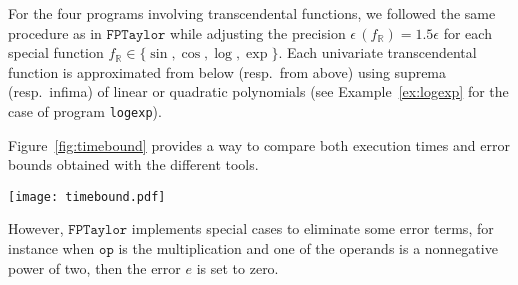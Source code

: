 \documentclass[preprint]{sigplanconf}
\newcommand{\code}[1]{\lstinline{#1}}
\newcommand{\R}{\mathbb{R}}
\newcommand{\realtofloat}{\mathtt{Real2Float}}
\newcommand{\op}{\mathtt{op}}
\newcommand{\rosa}{\mathtt{Rosa}}
\newcommand{\fptaylor}{\mathtt{FPTaylor}}
\theoremstyle{plain}
\begin{document}

For the four programs involving transcendental functions, we followed the same procedure as in $\fptaylor$ while adjusting the precision $\epsilon \,  (f_{\R}) = 1.5 \epsilon$ for each special function $f_{\R} \in \{\sin, \cos, \log, \exp \}$. Each univariate transcendental function is approximated from below (resp.~from above) using suprema (resp.~infima) of linear or quadratic polynomials (see Example~\ref{ex:logexp} for the case of program \code{logexp}). 


\fi

\begin{table*}[!ht]
\begin{center}
\caption{Comparison results of upper and lower bounds for absolute rounding errors (the best results are emphasized using \textbf{bold fonts})}

\label{table:error}
\end{center}
\end{table*}
%
Figure~\ref{fig:timebound} provides a way to compare both execution times and error bounds obtained with the different tools.
%
\begin{figure*}[!ht]
\begin{center}
\texttt{[image: timebound.pdf]}
\caption{Comparisons of execution times and upper bounds of rounding errors obtained with $\realtofloat$, $\rosa$ and $\fptaylor$}\label{fig:timebound}
\end{center}
\end{figure*}
%
\begin{table}[!ht]
\begin{center}
\caption{Comparison of execution times (in seconds) for absolute rounding error bounds (the best results are emphasized using \textbf{bold fonts})}

\label{table:cpu}
\end{center}
\end{table}

However, $\fptaylor$ implements special cases to eliminate some error terms, for instance when $\op$ is the multiplication and one of the operands is a nonnegative power of two, then the error $e$ is set to zero. 

\end{document}

